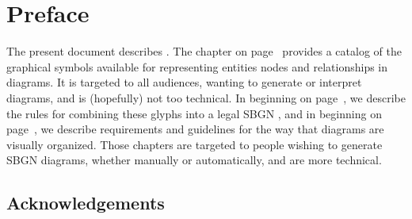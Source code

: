 
\chapter{Preface}

The present document describes \SBGNERLone. The chapter  on page ~\pageref{chp:glyph}provides a catalog of the graphical symbols available for representing entities nodes and relationships in \ER diagrams. It is targeted to all audiences, wanting to generate or interpret \ER diagrams, and is (hopefully) not too technical. In  beginning on page~\pageref{chp:grammar}, we describe the rules for combining these glyphs into a legal SBGN \ER, and in  beginning on page~\pageref{chp:layout}, we describe requirements and guidelines for the way that diagrams are visually organized. Those chapters are targeted to people wishing to generate SBGN diagrams, whether manually or automatically, and are more technical.

\section*{Acknowledgements}

% 

